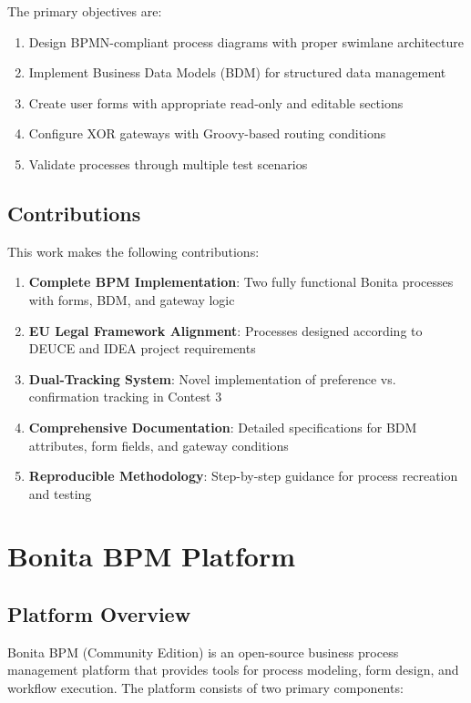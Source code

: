 \documentclass[12pt,a4paper]{article}
\begin{document}
The primary objectives are:
\begin{enumerate}
    \item Design BPMN-compliant process diagrams with proper swimlane architecture
    \item Implement Business Data Models (BDM) for structured data management
    \item Create user forms with appropriate read-only and editable sections
    \item Configure XOR gateways with Groovy-based routing conditions
    \item Validate processes through multiple test scenarios
\end{enumerate}

\subsection{Contributions}

This work makes the following contributions:
\begin{enumerate}
    \item \textbf{Complete BPM Implementation}: Two fully functional Bonita processes with forms, BDM, and gateway logic
    \item \textbf{EU Legal Framework Alignment}: Processes designed according to DEUCE and IDEA project requirements
    \item \textbf{Dual-Tracking System}: Novel implementation of preference vs. confirmation tracking in Contest 3
    \item \textbf{Comprehensive Documentation}: Detailed specifications for BDM attributes, form fields, and gateway conditions
    \item \textbf{Reproducible Methodology}: Step-by-step guidance for process recreation and testing
\end{enumerate}

\section{Bonita BPM Platform}

\subsection{Platform Overview}

Bonita BPM (Community Edition) is an open-source business process management platform that provides tools for process modeling, form design, and workflow execution. The platform consists of two primary components:
\end{document}
